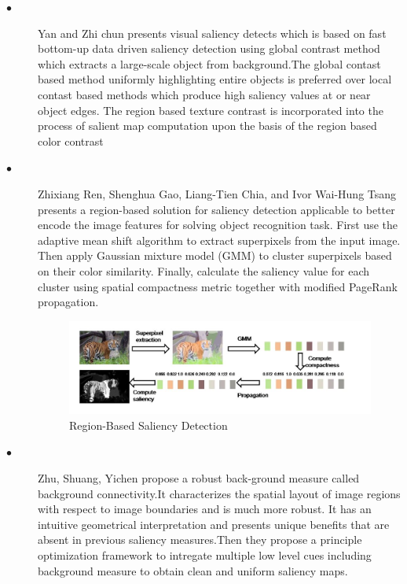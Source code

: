 \begin{description}
\begin{figure}[h!]
\end{figure}


\item[$\bullet$] Yan and Zhi chun \cite{ren2014salient}  presents visual saliency detects which is based on fast bottom-up data driven saliency detection using global contrast method which extracts a large-scale object from background.The global contast based method uniformly
highlighting entire objects is preferred over local contast
based methods which produce high saliency values at or
near object edges. The region based texture contrast is
incorporated into the process of salient map computation
upon the basis of the region based color contrast

\item[$\bullet$] Zhixiang Ren, Shenghua Gao, Liang-Tien Chia\cite{ren2014region}, and
Ivor Wai-Hung Tsang presents a region-based solution for
saliency detection applicable to better encode the image
features for solving object recognition task. First use the
adaptive mean shift algorithm to extract superpixels from the
input image. Then apply Gaussian mixture model (GMM) to
cluster superpixels based on their color similarity. Finally,
calculate the saliency value for each cluster using spatial
compactness metric together with modified PageRank
propagation.

\begin{figure}[h!]
  \centering
  \includegraphics[width=1\textwidth,height=.5\textwidth]{pictures/figure3.jpg}
  \caption[]{Region-Based Saliency Detection\cite{ren2014region}}
  \label{orangeleaf}
\end{figure}

\item[$\bullet$] Zhu, Shuang, Yichen \cite{zhu2014saliency}  propose a robust back-ground measure
called background connectivity.It characterizes the spatial layout of image regions with respect to
image boundaries and is much more robust. It has an intuitive geometrical interpretation and presents unique benefits that are absent in previous saliency measures.Then they propose a principle optimization framework to intregate multiple low level cues including background measure to obtain clean and uniform saliency maps.




\end{description}
